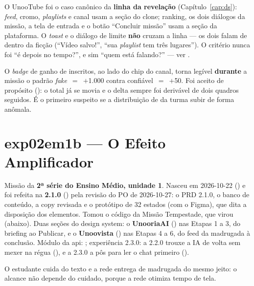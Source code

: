 \begin{nota}
O UnooTube foi o caso canônico da \textbf{linha da revelação}
(Capítulo~\ref{cap:ds}): \emph{feed}, cromo, \emph{playlists} e canal usam a
seção do clone; ranking, os dois diálogos da missão, a tela de entrada e o botão
\enquote{Concluir missão} usam a seção da plataforma. O \emph{toast} e o diálogo
de limite \textbf{não} cruzam a linha --- os dois falam de dentro da ficção
(\enquote{Vídeo salvo!}, \enquote{sua \emph{playlist} tem três lugares}). O
critério nunca foi \enquote{é depois no tempo?}, e sim \enquote{quem está
falando?} --- ver .
\end{nota}

\begin{regra}
O \emph{badge}  de ganho de inscritos, ao lado do chip do canal, torna
legível \textbf{durante} a missão o padrão \emph{fake}~$=$~$+$1.000 contra
confiável~$=$~$+$50. Foi aceito de propósito (): o total já se movia
e o delta sempre foi derivável de dois quadros seguidos. É o primeiro suspeito se
a distribuição de  da turma subir de forma anômala.
\end{regra}

\section{exp02em1b --- O Efeito Amplificador}
\label{sec:exp02em1b-efeito-amplificador}

Missão da \textbf{2ª série do Ensino Médio, unidade 1}. Nasceu em 2026-10-22
() e foi refeita na \textbf{2.1.0} () pela revisão
do PO de 2026-10-27: o PRD 2.1.0, o banco de conteúdo, a copy revisada e o
protótipo de 32 estados (com o Figma), que dita a disposição dos elementos.
Tomou o código da Missão Tempestade, que virou  (abaixo).
Duas seções do design system: o \textbf{UnooriaAI} () nas Etapas
1 a 3, do briefing ao Publicar, e o \textbf{Unoovista} () nas
Etapas 4 a 6, do feed da madrugada à conclusão. Módulo da api:
; experiência 2.3.0: a 2.2.0 trouxe a IA de volta
sem mexer na régua (), e a 2.3.0 a pôs para ler o chat
primeiro ().

\begin{destaque}
O estudante cuida do texto e a rede entrega de madrugada do mesmo jeito: o
alcance não depende do cuidado, porque a rede otimiza tempo de tela.
\end{destaque}

